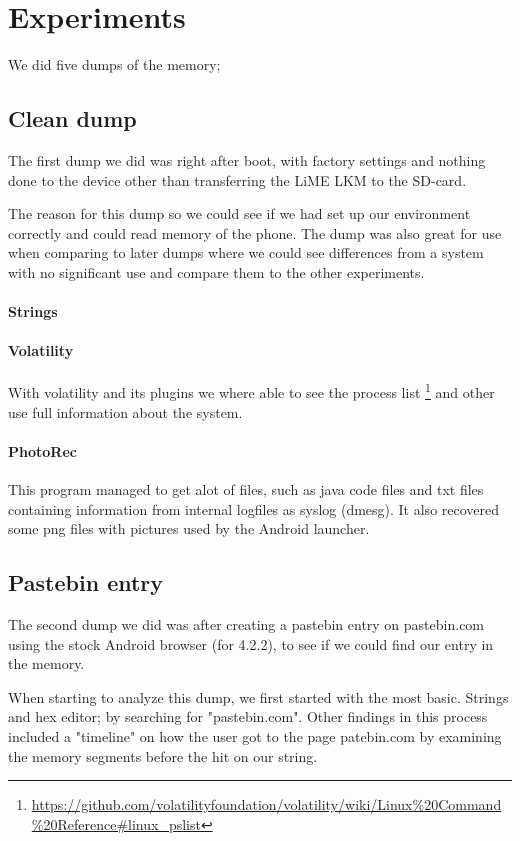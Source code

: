 \section{Experiments}
We did five dumps of the memory;
  \subsection{Clean dump}
  The first dump we did was right after boot, with factory settings and nothing done to the device 
  other than transferring the LiME LKM to the SD-card.
  
    The reason for this dump so we could see if we had set up our environment 
correctly and could read memory of the phone. The dump was also great for use 
when comparing to later dumps where we could see differences from a system with 
no significant use and compare them to the other experiments.

  \paragraph{Strings}

  \paragraph{Volatility}
  With volatility and its plugins we where able to see the process list
  \footnote{\url{https://github.com/volatilityfoundation/volatility/wiki/Linux\%20Command\%20Reference\#linux\_pslist}} 
  and other use full information about the system.

  \paragraph{PhotoRec}
  This program managed to get alot of files, such as java code files and txt 
  files containing information from internal logfiles as syslog (dmesg). It also 
  recovered some png files with pictures used by the Android launcher.
  
  \subsection{Pastebin entry}
  The second dump we did was after creating a pastebin entry on pastebin.com using 
  the stock Android browser (for 4.2.2),
  to see if we could find our entry in the memory.
  
  
  When starting to analyze this dump, we first started with the most basic. 
  Strings and hex editor; by searching for "pastebin.com". Other findings in this 
  process included a "timeline" on how the user got to the page patebin.com by 
  examining the memory segments before the hit on our string.

